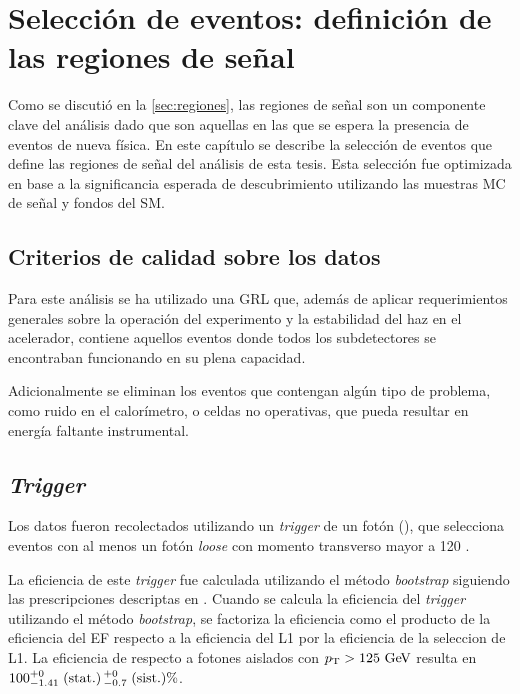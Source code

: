 \chapter{Selección de eventos: definición de las regiones de señal}
\label{cap:seleccion}

Como se discutió en la \cref{sec:regiones}, las regiones de señal son un
componente clave del análisis dado que son aquellas en las que se espera la
presencia de eventos de nueva física. En este capítulo se describe la selección
de eventos que define las regiones de señal del análisis de esta tesis. Esta
selección fue optimizada en base a la significancia esperada de descubrimiento
utilizando las muestras MC de señal y fondos del SM.



\section{Criterios de calidad sobre los datos}


Para este análisis se ha utilizado una GRL que, además de aplicar requerimientos
generales sobre la operación del experimento y la estabilidad del haz en el
acelerador, contiene aquellos eventos donde todos los subdetectores se
encontraban funcionando en su plena capacidad.

Adicionalmente se eliminan los eventos que contengan algún tipo de problema,
como ruido en el calorímetro, o celdas no operativas, que pueda resultar en
energía faltante instrumental.


\section{\emph{Trigger}}\label{sec:trigger}

Los datos fueron recolectados utilizando un \emph{trigger} de un fotón (\trigchain), que
selecciona eventos con al menos un fotón \emph{loose} con momento transverso mayor a
120 \gev.

La eficiencia de este \emph{trigger} fue calculada utilizando el método \emph{bootstrap}
siguiendo las prescripciones descriptas en \cite{ATLAS-CONF-2011-114,Damazio:1609629}.
Cuando se calcula la eficiencia del \emph{trigger} utilizando el método \emph{bootstrap}, se factoriza
la eficiencia como el producto de la eficiencia del EF respecto a la eficiencia del L1
por la eficiencia de la seleccion de L1.
La eficiencia de {\trigchain} respecto a fotones aislados con $\pt>125\gev$ resulta en
$100^{+0}_{-1.41}\mbox{$\;$(stat.)} \, {}^{+0}_{-0.7}\mbox{$\;$(sist.)} \%$.

